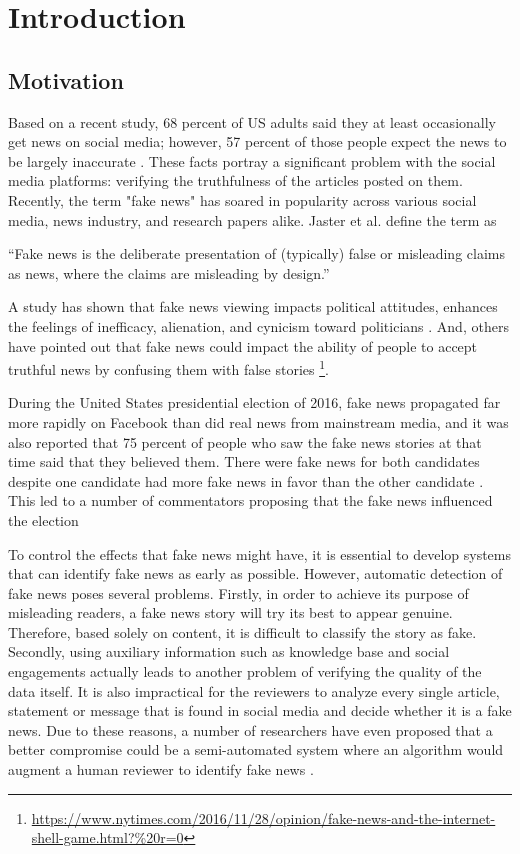 \chapter{Introduction}\label{introduction}

\section{Motivation}\label{intro:motivation}
Based on a recent study, 68 percent of US adults said they at least occasionally get news on social media; however, 57 percent of those people expect the news to be largely inaccurate \cite{matsa2018news}. These facts portray a significant problem with the social media platforms: verifying the truthfulness of the articles posted on them. Recently, the term "fake news" has soared in popularity across various social media, news industry, and research papers alike. Jaster et al. define the term as \cite{gelfert2018fake}

\enquote{Fake news is the deliberate presentation of (typically) false or misleading claims as news, where the claims are misleading by design.}

\noindent
A study has shown that fake news viewing impacts political attitudes, enhances the feelings of inefficacy, alienation, and cynicism toward politicians \cite{balmas2014fake}. And, others have pointed out that fake news could impact the ability of people to accept truthful news by confusing them with false stories \footnote{\url{https://www.nytimes.com/2016/11/28/opinion/fake-news-and-the-internet-shell-game.html?\%20r=0}}.

During the United States presidential election of 2016, fake news propagated far more rapidly on Facebook than did real news from mainstream media\cite{silverman2016analysis}, and it was also reported that 75 percent of people who saw the fake news stories at that time said that they believed them\cite{silverman2016most}. There were fake news for both candidates despite one candidate had more fake news in favor than the other candidate \cite{silverman2016analysis}. This led to a number of commentators proposing that the fake news influenced the election  \cite{parkinson2016click, read2016donald, dewey2016facebook}

To control the effects that fake news might have, it is essential to develop systems that can identify fake news as early as possible. However, automatic detection of fake news poses several problems. Firstly, in order to achieve its purpose of misleading readers, a fake news story will try its best to appear genuine. Therefore, based solely on content, it is difficult to classify the story as fake. Secondly, using auxiliary information such as knowledge base and social engagements actually leads to another problem of verifying the quality of the data itself\cite{shu2017fake}. It is also impractical for the reviewers to analyze every single article, statement or message that is found in social media and decide whether it is a fake news. Due to these reasons, a number of researchers have even proposed that a better compromise could be a semi-automated system where an algorithm would augment a human reviewer to identify fake news \cite{conroy2015automatic, chen2015news, wiegand2016veracity}.

